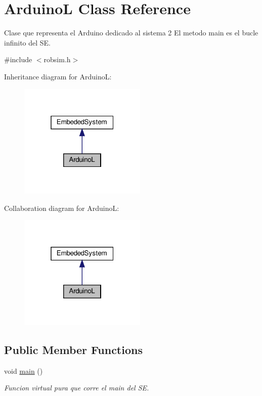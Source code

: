 \hypertarget{classArduinoL}{}\section{ArduinoL Class Reference}
\label{classArduinoL}


Clase que representa el Arduino dedicado al sistema 2 El metodo main es el bucle infinito del SE.  




{\ttfamily \#include $<$robsim.\+h$>$}



Inheritance diagram for ArduinoL\+:\nopagebreak
\begin{figure}[H]
\begin{center}
\leavevmode
\includegraphics[width=172pt]{classArduinoL__inherit__graph}
\end{center}
\end{figure}


Collaboration diagram for ArduinoL\+:\nopagebreak
\begin{figure}[H]
\begin{center}
\leavevmode
\includegraphics[width=172pt]{classArduinoL__coll__graph}
\end{center}
\end{figure}
\subsection*{Public Member Functions}
\begin{DoxyCompactItemize}
\item 
void \hyperlink{classArduinoL_a27a3e0f5bfbf48f558bce2d31a72d502}{main} ()
\begin{DoxyCompactList}\small\item\em Funcion virtual pura que corre el main del SE. \end{DoxyCompactList}\end{DoxyCompactItemize}


